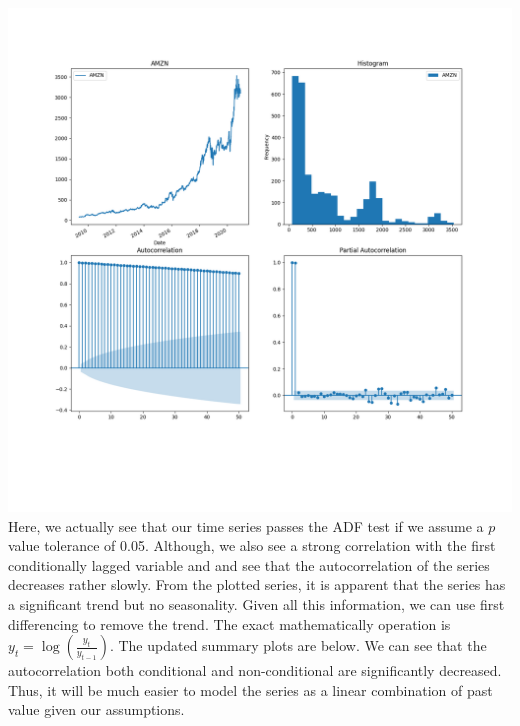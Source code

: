 \documentclass{article}
\begin{document}
\includegraphics[width=\textwidth]{../output/AMZN_summary.png}
Here, we actually see that our time series passes the ADF test if we assume a $p$ value tolerance of 0.05. Although, we also see a strong correlation with the first conditionally lagged variable and and see that the autocorrelation of the series decreases rather slowly. From the plotted series, it is apparent that the series has a significant trend but no seasonality. Given all this information, we can use first differencing to remove the trend. The exact mathematically operation is $y_t = \log(\frac{y_t}{y_{t-1}})$. The updated summary plots are below. We can see that the autocorrelation both conditional and non-conditional are significantly decreased. Thus, it will be much easier to model the series as a linear combination of past value given our assumptions.
\end{document}
